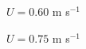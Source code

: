 \documentclass{beamer}
\begin{document}
\begin{frame}
\begin{columns}[t]
\begin{column}{0.3\paperwidth}
    \end{column}

    \begin{column}{0.3\paperwidth}

      \centering

      $U = 0.60$ m s$^{-1}$


      \vspace{1cm}

      $U = 0.75$ m s$^{-1}$



\end{column}
\end{columns}
\end{frame}
\end{document}
